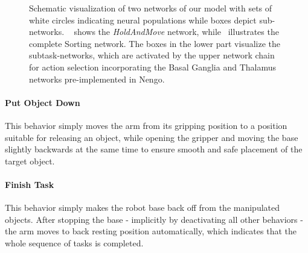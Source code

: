 \begin{figure}[t]
    \centering
    \caption{Schematic visualization of two networks of our model with sets of white circles indicating neural populations while boxes depict sub-networks.
       ~\protect{} shows the \emph{HoldAndMove} network, while~\protect{} illustrates the complete Sorting network.
The boxes in the lower part visualize the subtask-networks, which are activated by the upper network chain for action selection incorporating the Basal Ganglia and Thalamus networks pre-implemented in \ac{Nengo}.
    }
    \label{fig:omni_bot_nets_sort}
\end{figure}

\paragraph{Put Object Down} 
\label{putdown}
This behavior simply moves the arm from its gripping position to a position suitable for releasing an object, while opening the gripper and moving the base slightly backwards at the same time to ensure smooth and safe placement of the target object.

\paragraph{Finish Task} 
\label{finish}

This behavior simply makes the robot base back off from the manipulated objects. 
After stopping the base - implicitly by deactivating all other behaviors - the arm moves to back resting position automatically, which indicates that the whole sequence of tasks is completed.

